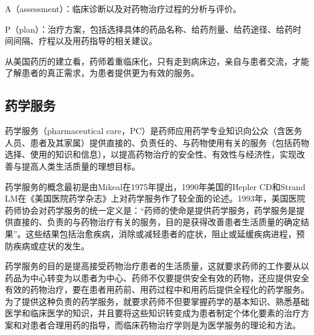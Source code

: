 A（assessment）：临床诊断以及对药物治疗过程的分析与评价。

P（plan）：治疗方案，包括选择具体的药品名称、给药剂量、给药途径、给药时间间隔、疗程以及用药指导的相关建议。

从美国药历的建立看，药师着重临床化，只有走到病床边，亲自与患者交流，才能了解患者的真正需求，为患者提供更为有效的服务。

\subsection{药学服务}

药学服务（pharmaceutical
care，PC）是药师应用药学专业知识向公众（含医务人员、患者及其家属）提供直接的、负责任的、与药物使用有关的服务（包括药物选择、使用的知识和信息），以提高药物治疗的安全性、有效性与经济性，实现改善与提高人类生活质量的理想目标。

药学服务的概念最初是由Mikeal在1975年提出，1990年美国的Hepler CD和Strand
LM在《美国医院药学杂志》上对药学服务作了较全面的论述。1993年，美国医院药师协会对药学服务的统一定义是：``药师的使命是提供药学服务，药学服务是提供直接的、负责的与药物治疗有关的服务，目的是获得改善患者生活质量的确定结果''。这些结果包括治愈疾病，消除或减轻患者的症状，阻止或延缓疾病进程，预防疾病或症状的发生。

药学服务的目的是提高接受药物治疗患者的生活质量，这就要求药师的工作要从以药品为中心转变为以患者为中心、药师不仅要提供安全有效的药物，还应提供安全有效的药物治疗，要在患者用药前、用药过程中和用药后提供全程化的药学服务。为了提供这种负责的药学服务，就要求药师不但要掌握药学的基本知识、熟悉基础医学和临床医学的知识，并且要将这些知识转变成为患者制定个体化要素的治疗方案和对患者合理用药的指导，而临床药物治疗学则是为医学服务的理论和方法。

